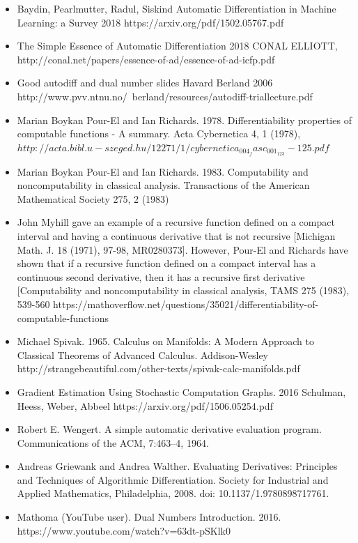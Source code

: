\documentclass[11pt]{article}
\theoremstyle{definition}
\theoremstyle{plain}
\begin{document}
\begin{itemize}
    
    \item  Baydin, Pearlmutter, Radul, Siskind
    Automatic Differentiation
    in Machine Learning: a Survey 2018
    https://arxiv.org/pdf/1502.05767.pdf

    \item The Simple Essence of Automatic Differentiation 2018
    CONAL ELLIOTT, http://conal.net/papers/essence-of-ad/essence-of-ad-icfp.pdf

    \item Good autodiff and dual number slides
    Havard Berland 2006
    http://www.pvv.ntnu.no/~berland/resources/autodiff-triallecture.pdf

    \item Marian Boykan Pour-El and Ian Richards. 1978. 
    Differentiability properties of computable functions - A summary. 
    Acta Cybernetica 4, 1 (1978), 
    $http://acta.bibl.u-szeged.hu/12271/1/cybernetica_004_fasc_001_123-125.pdf$

    \item Marian Boykan Pour-El and Ian Richards. 1983. 
    Computability and noncomputability in classical analysis. Transactions of
    the American Mathematical Society 275, 2 (1983)

    \item John Myhill gave an example of a recursive function defined on a 
    compact interval and having a continuous derivative that is not recursive 
    [Michigan Math. J. 18 (1971), 97-98, MR0280373]. However, Pour-El and Richards 
    have shown that if a recursive function defined on a compact interval has a 
    continuous second derivative, then it has a recursive first derivative 
    [Computability and noncomputability in classical analysis, TAMS 275 (1983), 539-560
    https://mathoverflow.net/questions/35021/differentiability-of-computable-functions

    \item Michael Spivak. 1965. Calculus on Manifolds: A Modern Approach to 
    Classical Theorems of Advanced Calculus. Addison-Wesley
    http://strangebeautiful.com/other-texts/spivak-calc-manifolds.pdf

    \item Gradient Estimation Using Stochastic Computation Graphs. 2016
    Schulman, Heess, Weber, Abbeel
    https://arxiv.org/pdf/1506.05254.pdf

    \item Robert E. Wengert. A simple automatic derivative evaluation program. 
    Communications of the ACM, 7:463–4, 1964.

    \item Andreas Griewank and Andrea Walther. Evaluating Derivatives: 
    Principles and Techniques of Algorithmic Differentiation. Society for 
    Industrial and Applied Mathematics, Philadelphia, 2008. doi: 10.1137/1.9780898717761.

    \item Mathoma (YouTube user). Dual Numbers Introduction. 2016.
    https://www.youtube.com/watch?v=63dt-pSKlk0 

\end{itemize}
\end{document}
